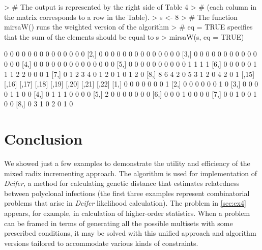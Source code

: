\documentclass[12pt]{article}
\begin{document}
\begin{Schunk}
\begin{Sinput}
> # The output is represented by the right side of Table 4
> # (each column in the matrix corresponds to a row in the Table).
> s <- 8
> # The function mirsaW() runs the weighted version of the algorithm 
> # eq = TRUE specifies that the sum of the elements should be equal to s 
> mirsaW(s, eq = TRUE)  
\end{Sinput}
\begin{Soutput}
     [,1] [,2] [,3] [,4] [,5] [,6] [,7] [,8] [,9] [,10] [,11] [,12] [,13] [,14]
[1,]    0    0    0    0    0    0    0    0    0     0     0     0     0     0
[2,]    0    0    0    0    0    0    0    0    0     0     0     0     0     0
[3,]    0    0    0    0    0    0    0    0    0     0     0     0     0     0
[4,]    0    0    0    0    0    0    0    0    0     0     0     0     0     0
[5,]    0    0    0    0    0    0    0    0    0     0     1     1     1     1
[6,]    0    0    0    0    0    1    1    1    2     2     0     0     0     1
[7,]    0    1    2    3    4    0    1    2    0     1     0     1     2     0
[8,]    8    6    4    2    0    5    3    1    2     0     4     2     0     1
     [,15] [,16] [,17] [,18] [,19] [,20] [,21] [,22]
[1,]     0     0     0     0     0     0     0     1
[2,]     0     0     0     0     0     0     1     0
[3,]     0     0     0     0     1     1     0     0
[4,]     0     1     1     1     0     0     0     0
[5,]     2     0     0     0     0     0     0     0
[6,]     0     0     0     1     0     0     0     0
[7,]     0     0     1     0     0     1     0     0
[8,]     0     3     1     0     2     0     1     0
\end{Soutput}
\end{Schunk}

\section{Conclusion}

We showed just a few examples to demonstrate the utility and efficiency of the mixed radix incrementing approach. The algorithm is used for implementation of \textit{Dcifer}, a method for calculating genetic distance that estimates relatedness between polyclonal infections (the first three examples represent combinatorial problems that arise in \textit{Dcifer} likelihood calculation). The problem in \ref{sec:ex4} appears, for example, in calculation of higher-order statistics. When a problem can be framed in terms of generating all the possible multisets with some prescribed conditions, it may be solved with this unified approach and algorithm versions tailored to accommodate various kinds of constraints. 



\end{document}
